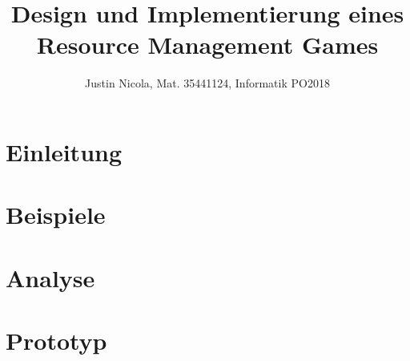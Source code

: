 \documentclass{article}
\title{Design und Implementierung eines Resource Management Games}
\author{Justin Nicola, Mat. 35441124, Informatik PO2018}
\begin{document}






\maketitle
\section{Einleitung}


\section{Beispiele}


\section{Analyse}


\section{Prototyp}


\newpage
\printbibliography

\newpage

\end{document}
